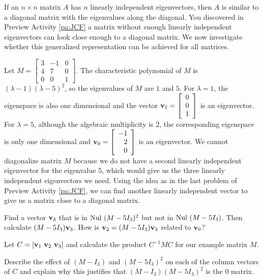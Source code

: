 
If an $n \times n$ matrix $A$ has $n$ linearly independent eigenvectors, then $A$ is similar to a diagonal matrix with the eigenvalues along the diagonal. You discovered in Preview Activity \ref{pa:JCF} a matrix without enough linearly independent eigenvectors can look close enough to a diagonal matrix. We now investigate whether this generalized representation can be achieved for all matrices.

\begin{activity} \label{act:JC_intro} Let $M = \left[ \begin{array}{crc} 3 &-1 & 0  \\ 4 & 7 & 0 \\ 0&0&1 \end{array} \right]$. The characteristic polynomial of $M$ is $(\lambda-1)(\lambda - 5)^2$, so the eigenvalues of $M$ are $1$ and $5$. For $\lambda=1$, the eigenspace is also one dimensional and the vector $\mathbf{v}_1 = \left[ \begin{array}{c} 0 \\ 0 \\ 1 \end{array}\right]$ is an eigenvector. For $\lambda=5$, although the algebraic multiplicity is 2, the corresponding eigenspace is only one dimensional and $\mathbf{v}_0 = \left[ \begin{array}{r} -1\\2\\0 \end{array}\right]$ is an eigenvector. We cannot diagonalize matrix $M$ because we do not have a second linearly independent eigenvector for the eigenvalue 5, which would give us the three linearly independent eigenvectors we need. Using the idea as in the last problem of Preview Activity \ref{pa:JCF}, we can find another linearly independent vector to give us a matrix close to a diagonal matrix.

\ba
\item Find a vector $\mathbf{v}_3$ that is in $\text{Nul } (M-5I_3)^2$ but not in $\text{Nul } (M-5I_3)$. Then calculate $(M-5I_3)\mathbf{v}_3$. How is $\mathbf{v}_2 = (M-5I_3)\mathbf{v}_3$ related to $\mathbf{v}_0$?  

\item  Let $C = [\mathbf{v}_1 \ \mathbf{v}_2 \ \mathbf{v}_3]$ and calculate the product $C^{-1}MC$ for our example matrix $M$. 

\item Describe the effect of $(M-I_3)$ and $(M-5I_3)^2$ on each of the column vectors of $C$ and explain why this justifies that $(M-I_3)(M-5I_3)^2$ is the 0 matrix.


\ea

\end{activity}

